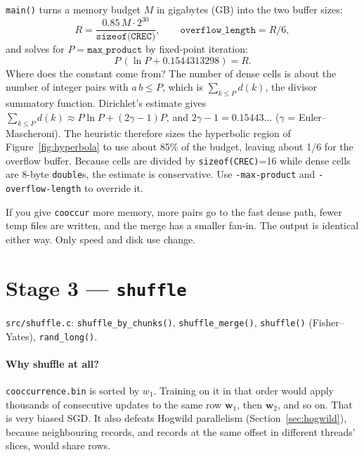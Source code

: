 \documentclass[11pt,a4paper]{article}
\newcommand{\file}[1]{\texttt{#1}}
\newcommand{\fn}[1]{\texttt{#1()}}
\newcommand{\opt}[1]{\texttt{-#1}}
\newcommand{\wv}{\mathbf{w}}
\begin{document}
\fn{main} turns a memory budget $M$ in gigabytes (GB) into the two buffer sizes:
\[
  R = \frac{0.85\,M\cdot 2^{30}}{\texttt{sizeof(CREC)}},\qquad
  \texttt{overflow\_length} = R/6,
\]
and solves for $P=\texttt{max\_product}$ by fixed-point iteration:
\[
  P\,(\ln P + 0.1544313298) = R.
\]
Where does the constant come from? The number of dense cells is about the number of
integer pairs with $a\,b\le P$, which is $\sum_{k\le P} d(k)$, the divisor summatory
function. Dirichlet's estimate gives $\sum_{k\le P} d(k)\approx P\ln P + (2\gamma-1)P$,
and $2\gamma-1 = 0.15443\ldots$ ($\gamma$ = Euler--Mascheroni). The heuristic therefore
sizes the hyperbolic region of Figure~\ref{fig:hyperbola} to use about 85\% of the
budget, leaving about 1/6 for the overflow buffer. Because cells are divided by
\texttt{sizeof(CREC)}=16 while dense cells are 8-byte \texttt{double}s, the estimate is
conservative. Use \opt{max-product} and \opt{overflow-length} to override it.

\begin{insight}
If you give \texttt{cooccur} more memory, more pairs go to the fast dense path, fewer temp
files are written, and the merge has a smaller fan-in. The output is identical either way.
Only speed and disk use change.
\end{insight}

\section{Stage 3 --- \texttt{shuffle}}

\begin{codeloc}
\file{src/shuffle.c}: \fn{shuffle\_by\_chunks}, \fn{shuffle\_merge}, \fn{shuffle}
(Fisher--Yates), \fn{rand\_long}.
\end{codeloc}

\paragraph{Why shuffle at all?} \file{cooccurrence.bin} is sorted by $w_1$. Training on it
in that order would apply thousands of consecutive updates to the same row $\wv_1$, then
$\wv_2$, and so on. That is very biased SGD. It also defeats Hogwild parallelism
(Section~\ref{sec:hogwild}), because neighbouring records, and records at the same offset
in different threads' slices, would share rows.
\end{document}
